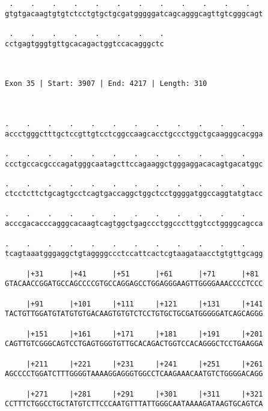 \documentclass{article}
\begin{document}
\begin{Verbatim}
 .    .    .    .    .    .    .    .    .    .    .    .   
gtgtgacaagtgtgtctcctgtgctgcgatgggggatcagcagggcagttgtcgggcagt
                                                            
 .    .    .    .    .    .    .    .
cctgagtgggtgttgcacagactggtccacagggctc
                                     
                                     
 
Exon 35 | Start: 3907 | End: 4217 | Length: 310



.    .    .    .    .    .    .    .    .    .    .    .    
accctgggctttgctccgttgtcctcggccaagcacctgccctggctgcaagggcacgga
                                                            
.    .    .    .    .    .    .    .    .    .    .    .    
ccctgccacgcccagatgggcaatagcttccagaaggctgggaggacacagtgacatggc
                                                            
.    .    .    .    .    .    .    .    .    .    .    .    
ctcctcttctgcagtgcctcagtgaccaggctggctcctggggatggccaggtatgtacc
                                                            
.    .    .    .    .    .    .    .    .    .    .    .    
acccgacacccagggcacaagtcagtggctgagccctggcccttggtcctggggcagcca
                                                            
.    .    .    .    .    .    .    .    .    .    .    .    
tcagtaaatgggaggctgtaggggccctccattcactcgtaagataacctgtgttgcagg
                                                            
     |+31      |+41      |+51      |+61      |+71      |+81 
GTACAACCGGATGCCAGCCCCGTGCCAGGAGCCTGGAGGGAAGTTGGGGAAACCCCTCCC
                                                            
     |+91      |+101     |+111     |+121     |+131     |+141
TACTGTTGGATGTATGTGTGACAAGTGTGTCTCCTGTGCTGCGATGGGGGATCAGCAGGG
                                                            
     |+151     |+161     |+171     |+181     |+191     |+201
CAGTTGTCGGGCAGTCCTGAGTGGGTGTTGCACAGACTGGTCCACAGGGCTCCTGAAGGA
                                                            
     |+211     |+221     |+231     |+241     |+251     |+261
AGCCCCTGGATCTTTGGGGTAAAAGGAGGGTGGCCTCAAGAAACAATGTCTGGGGACAGG
                                                            
     |+271     |+281     |+291     |+301     |+311     |+321
CCTTTCTGGCCTGCTATGTCTTCCCAATGTTTATTGGGCAATAAAAGATAAGTGCAGTCA
                                                            

\end{Verbatim}
\end{document}
